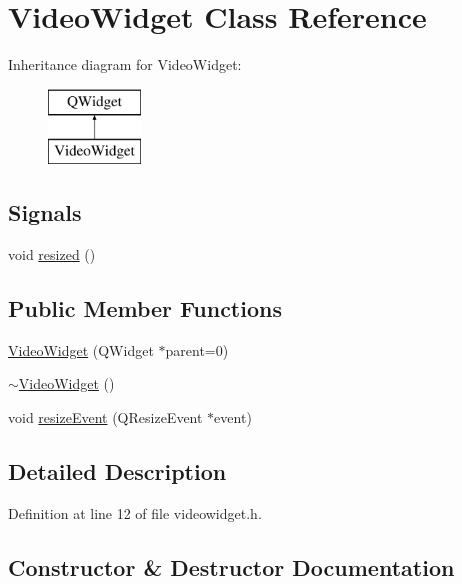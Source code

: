 \hypertarget{classVideoWidget}{}\section{Video\+Widget Class Reference}
\label{classVideoWidget}
Inheritance diagram for Video\+Widget\+:\begin{figure}[H]
\begin{center}
\leavevmode
\includegraphics[height=2.000000cm]{classVideoWidget}
\end{center}
\end{figure}
\subsection*{Signals}
\begin{DoxyCompactItemize}
\item 
void \hyperlink{classVideoWidget_aa991152a3b4daee62a7a651cfb06fcf0}{resized} ()
\end{DoxyCompactItemize}
\subsection*{Public Member Functions}
\begin{DoxyCompactItemize}
\item 
\hyperlink{classVideoWidget_a31e7897e4abd9733d45753e4a2e25882}{Video\+Widget} (Q\+Widget $\ast$parent=0)
\item 
\hyperlink{classVideoWidget_a77b8af4076f462cb5db7932e88d46829}{$\sim$\+Video\+Widget} ()
\item 
void \hyperlink{classVideoWidget_a535271277b91deed6d52cb1d11caf80d}{resize\+Event} (Q\+Resize\+Event $\ast$event)
\end{DoxyCompactItemize}


\subsection{Detailed Description}


Definition at line 12 of file videowidget.\+h.



\subsection{Constructor \& Destructor Documentation}
\hypertarget{classVideoWidget_a31e7897e4abd9733d45753e4a2e25882}{}
